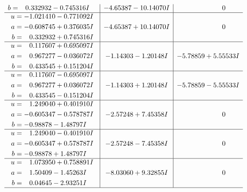 \documentclass[1p]{elsarticle_modified}
\theoremstyle{definition}
\begin{document}
$$\begin{array}{c|c|c}
\begin{aligned}
b &= \phantom{-}0.332932 - 0.745316 I\end{aligned}
 & -4.65387 - 10.14070 I & \phantom{-0.000000 } 0 \\ \hline\begin{aligned}
u &= -1.021410 - 0.771092 I \\
a &= -0.608745 + 0.376035 I \\
b &= \phantom{-}0.332932 + 0.745316 I\end{aligned}
 & -4.65387 + 10.14070 I & \phantom{-0.000000 } 0 \\ \hline\begin{aligned}
u &= \phantom{-}0.117607 + 0.695097 I \\
a &= \phantom{-}0.967277 - 0.036072 I \\
b &= \phantom{-}0.433545 + 0.151204 I\end{aligned}
 & -1.14303 - 1.20148 I & -5.78859 + 5.55533 I \\ \hline\begin{aligned}
u &= \phantom{-}0.117607 - 0.695097 I \\
a &= \phantom{-}0.967277 + 0.036072 I \\
b &= \phantom{-}0.433545 - 0.151204 I\end{aligned}
 & -1.14303 + 1.20148 I & -5.78859 - 5.55533 I \\ \hline\begin{aligned}
u &= \phantom{-}1.249040 + 0.401910 I \\
a &= -0.605347 - 0.578787 I \\
b &= -0.98878 - 1.48797 I\end{aligned}
 & -2.57248 + 7.45358 I & \phantom{-0.000000 } 0 \\ \hline\begin{aligned}
u &= \phantom{-}1.249040 - 0.401910 I \\
a &= -0.605347 + 0.578787 I \\
b &= -0.98878 + 1.48797 I\end{aligned}
 & -2.57248 - 7.45358 I & \phantom{-0.000000 } 0 \\ \hline\begin{aligned}
u &= \phantom{-}1.073950 + 0.758891 I \\
a &= \phantom{-}1.50409 - 1.45263 I \\
b &= \phantom{-}0.04645 - 2.93251 I\end{aligned}
 & -8.03060 + 9.32855 I & \phantom{-0.000000 } 0\\
 \hline 
 \end{array}$$\newpage$$\begin{array}{c|c|c}  

\end{array}$$
\end{document}
